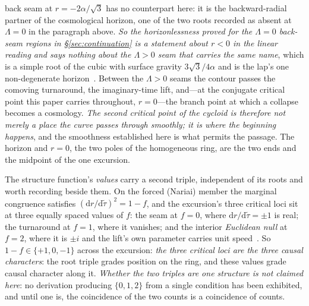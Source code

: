\documentclass[11pt,a4paper]{article}
\theoremstyle{definition}
\newcommand{\dd}{\mathrm{d}}   %
\begin{document}
back seam at $r=-2\alpha/\sqrt3$ has no counterpart here: it is the backward-radial partner of the cosmological
horizon, one of the two roots recorded as absent at $\Lambda=0$ in the paragraph above. \emph{So the
horizonlessness proved for the $\Lambda=0$ back-seam regions in \S\ref{sec:continuation} is a statement about
$r<0$ in the linear reading and says nothing about the $\Lambda>0$ seam that carries the same name}, which is a
simple root of the cubic with surface gravity $3\sqrt3/4\alpha$ and is the lap's one non-degenerate
horizon~\cite{JanzenCRframework}. Between the $\Lambda>0$ seams the contour passes the comoving turnaround, the imaginary-time lift, and---at the
conjugate critical point this paper carries throughout, $r=0$---the branch point at which a collapse becomes a
cosmology. \emph{The second critical point of the cycloid is therefore not merely a place the curve passes
through smoothly; it is where the beginning happens}, and the smoothness established here is what permits the
passage. The horizon and $r=0$, the two poles of the homogeneous ring, are the two ends and the midpoint of the
one excursion.

The structure function's \emph{values} carry a second triple, independent of its roots and worth recording
beside them. On the forced (Nariai) member the marginal congruence satisfies
$(\dd r/\dd\tilde\tau)^{2}=1-f$, and the excursion's three critical loci sit at three equally spaced values of
$f$: the seam at $f=0$, where $\dd r/\dd\tilde\tau=\pm1$ is real; the turnaround at $f=1$, where it vanishes;
and the interior \emph{Euclidean null} at $f=2$, where it is $\pm i$ and the lift's own parameter carries unit
speed~\cite{JanzenCRframework}. So $1-f\in\{+1,0,-1\}$ across the excursion: \emph{the three critical loci are
the three causal characters}: the root triple grades position on the ring, and these values grade causal character along it. \emph{Whether the two triples are one structure is not claimed here}: no derivation producing $\{0,1,2\}$ from a single condition has been exhibited, and until one is, the coincidence of the two counts is a coincidence of counts.
\end{document}
